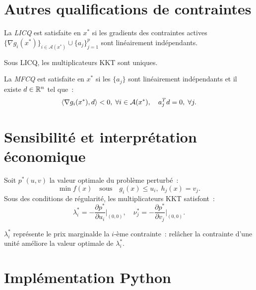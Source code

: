 \section{Autres qualifications de contraintes}

\begin{definition}
La \emph{LICQ} est satisfaite en $x^*$ si les gradients des contraintes actives
$\{\nabla g_i(x^*)\}_{i \in \mathcal{A}(x^*)} \cup \{a_j\}_{j=1}^p$ sont
lin\'eairement ind\'ependants.
\end{definition}

\begin{proposition}
Sous LICQ, les multiplicateurs KKT sont uniques.
\end{proposition}

\begin{definition}
La \emph{MFCQ} est satisfaite en $x^*$ si les $\{a_j\}$ sont lin\'eairement
ind\'ependants et il existe $d \in \mathbb{R}^n$ tel que~:
\[
    \langle \nabla g_i(x^*), d \rangle < 0, \; \forall i \in \mathcal{A}(x^*), \quad
    a_j^T d = 0, \; \forall j.
\]
\end{definition}

\section{Sensibilit\'e et interpr\'etation \'economique}

\begin{theoreme}[Sensibilit\'e]
\label{thm:sensibilite}
Soit $p^*(u, v)$ la valeur optimale du probl\`eme perturb\'e~:
\[
    \min f(x) \quad \text{sous} \quad g_i(x) \leq u_i, \; h_j(x) = v_j.
\]
Sous des conditions de r\'egularit\'e, les multiplicateurs KKT satisfont~:
\[
    \lambda_i^* = -\frac{\partial p^*}{\partial u_i}\bigg|_{(0,0)}, \quad
    \nu_j^* = -\frac{\partial p^*}{\partial v_j}\bigg|_{(0,0)}.
\]
\end{theoreme}

\begin{remarque}
$\lambda_i^*$ repr\'esente le \og{}prix marginal\fg de la $i$-\`eme contrainte~:
rel\^acher la contrainte d'une unit\'e am\'eliore la valeur optimale de $\lambda_i^*$.
\end{remarque}

\section{Impl\'ementation Python}

